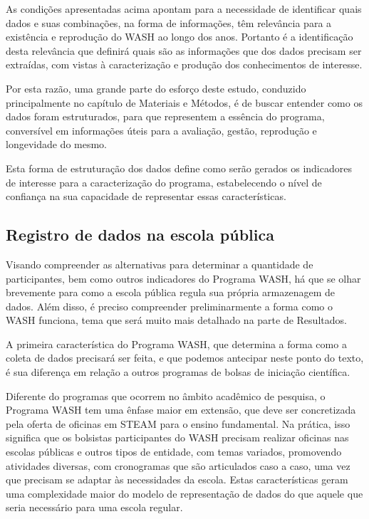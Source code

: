 As condições apresentadas acima apontam para a necessidade de identificar quais dados e suas combinações, na forma de informações, têm relevância para a existência e reprodução do WASH ao longo dos anos. Portanto é a identificação desta relevância que definirá quais são as informações que dos dados precisam ser extraídas, com vistas à  caracterização e produção dos conhecimentos de interesse.

Por esta razão, uma grande parte do esforço deste estudo, conduzido principalmente no capítulo de Materiais e Métodos, é de buscar entender como os dados foram estruturados, para que representem a essência do programa, conversível em informações úteis para a avaliação, gestão, reprodução e longevidade do mesmo.

Esta forma de estruturação dos dados define como serão gerados os indicadores de interesse para a caracterização do programa, estabelecendo o nível de confiança na sua capacidade de representar essas características.

\subsection[Registro de dados na escola pública]{Registro de dados na escola pública}\label{Registro de dados na escola pública}
Visando compreender as alternativas para determinar a quantidade de participantes, bem como outros indicadores do Programa WASH, há que se olhar brevemente para como a escola pública regula sua própria armazenagem de dados. Além disso, é preciso compreender preliminarmente a forma como o WASH funciona, tema que será muito mais detalhado na parte de Resultados.

A primeira característica do Programa WASH, que determina a forma como a coleta de dados precisará ser feita, e que podemos antecipar neste ponto do texto, é sua diferença em relação a outros programas de bolsas de iniciação científica.

Diferente do programas que ocorrem no âmbito acadêmico de pesquisa, o Programa WASH tem uma ênfase maior em extensão, que deve ser concretizada pela oferta de oficinas em STEAM para o ensino fundamental. Na prática, isso significa que os bolsistas participantes do WASH precisam realizar oficinas nas escolas públicas e outros tipos de entidade, com temas variados, promovendo atividades diversas, com cronogramas que são articulados caso a caso, uma vez que precisam se adaptar às necessidades da escola. Estas características geram uma complexidade maior do modelo de representação de dados do que aquele que seria necessário para uma escola regular.

